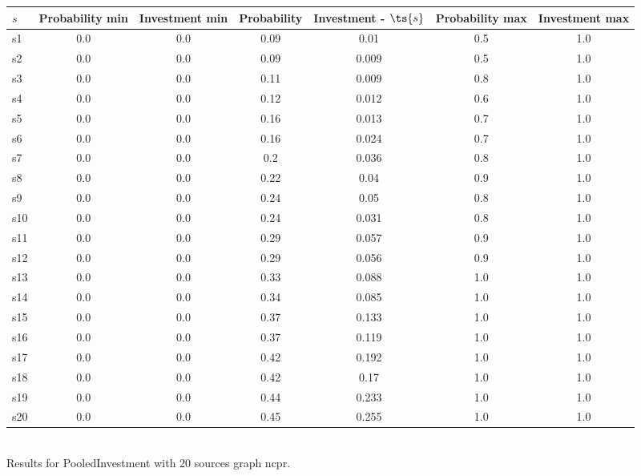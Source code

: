 \documentclass{article}
\begin{document}
\noindent\begin{tabular}{|l|c|c|c|c|c|c|}
\hline
$s$& Probability min & Investment min & Probability & Investment - $\ts{s}$ & Probability max & Investment max\\
\hline
s1 &0.0 & 0.0 & 0.09 & 0.01 & 0.5 & 1.0\\
\hline
s2 &0.0 & 0.0 & 0.09 & 0.009 & 0.5 & 1.0\\
\hline
s3 &0.0 & 0.0 & 0.11 & 0.009 & 0.8 & 1.0\\
\hline
s4 &0.0 & 0.0 & 0.12 & 0.012 & 0.6 & 1.0\\
\hline
s5 &0.0 & 0.0 & 0.16 & 0.013 & 0.7 & 1.0\\
\hline
s6 &0.0 & 0.0 & 0.16 & 0.024 & 0.7 & 1.0\\
\hline
s7 &0.0 & 0.0 & 0.2 & 0.036 & 0.8 & 1.0\\
\hline
s8 &0.0 & 0.0 & 0.22 & 0.04 & 0.9 & 1.0\\
\hline
s9 &0.0 & 0.0 & 0.24 & 0.05 & 0.8 & 1.0\\
\hline
s10 &0.0 & 0.0 & 0.24 & 0.031 & 0.8 & 1.0\\
\hline
s11 &0.0 & 0.0 & 0.29 & 0.057 & 0.9 & 1.0\\
\hline
s12 &0.0 & 0.0 & 0.29 & 0.056 & 0.9 & 1.0\\
\hline
s13 &0.0 & 0.0 & 0.33 & 0.088 & 1.0 & 1.0\\
\hline
s14 &0.0 & 0.0 & 0.34 & 0.085 & 1.0 & 1.0\\
\hline
s15 &0.0 & 0.0 & 0.37 & 0.133 & 1.0 & 1.0\\
\hline
s16 &0.0 & 0.0 & 0.37 & 0.119 & 1.0 & 1.0\\
\hline
s17 &0.0 & 0.0 & 0.42 & 0.192 & 1.0 & 1.0\\
\hline
s18 &0.0 & 0.0 & 0.42 & 0.17 & 1.0 & 1.0\\
\hline
s19 &0.0 & 0.0 & 0.44 & 0.233 & 1.0 & 1.0\\
\hline
s20 &0.0 & 0.0 & 0.45 & 0.255 & 1.0 & 1.0\\
\hline
\end{tabular}\\

\noindent Results for PooledInvestment with 20 sources graph ncpr.
\end{document}
